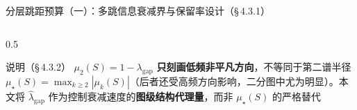 \documentclass[aspectratio=169,9pt,xcolor=dvipsnames]{beamer}
\begin{document}
\begin{frame}{分层跳距预算（一）：多跳信息衰减界与保留率设计（§\,4.3.1）}
\begin{columns}[T]
\begin{column}{0.5\textwidth}
  \vspace{0.1cm}
  \begin{alertblock}{说明（§\,4.3.2）}
    $\mu_2(S)=1-\lambda_{\mathrm{gap}}$ \textbf{只刻画低频非平凡方向}，不等同于第二谱半径 $\mu_\star(S)=\max_{k\ge2}|\mu_k(S)|$（后者还受高频方向影响，二分图中尤为明显）。本文将 $\hat{\lambda}_{\mathrm{gap}}$ 作为控制衰减速度的\textbf{图级结构代理量}，而非 $\mu_\star(S)$ 的严格替代
  \end{alertblock}


\end{column}
\end{columns}
\end{frame}
\end{document}
